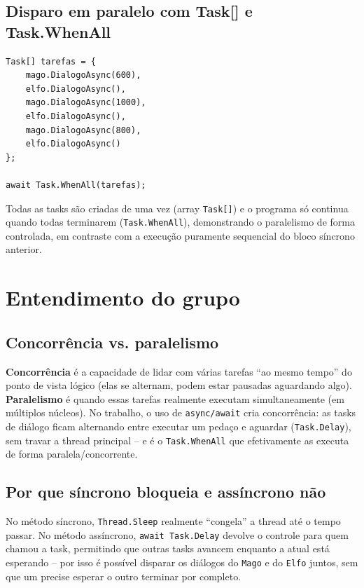 \documentclass[12pt,a4paper]{article}
\begin{document}
\subsection{Disparo em paralelo com Task[] e Task.WhenAll}

\begin{lstlisting}
Task[] tarefas = {
    mago.DialogoAsync(600),
    elfo.DialogoAsync(),
    mago.DialogoAsync(1000),
    elfo.DialogoAsync(),
    mago.DialogoAsync(800),
    elfo.DialogoAsync()
};

await Task.WhenAll(tarefas);
\end{lstlisting}

Todas as tasks são criadas de uma vez (array \texttt{Task[]}) e o programa só
continua quando todas terminarem (\texttt{Task.WhenAll}), demonstrando o paralelismo
de forma controlada, em contraste com a execução puramente sequencial do bloco
síncrono anterior.

\section{Entendimento do grupo}

\subsection{Concorrência vs. paralelismo}

\textbf{Concorrência} é a capacidade de lidar com várias tarefas ``ao mesmo tempo''
do ponto de vista lógico (elas se alternam, podem estar pausadas aguardando
algo). \textbf{Paralelismo} é quando essas tarefas realmente executam
simultaneamente (em múltiplos núcleos). No trabalho, o uso de \texttt{async/await}
cria concorrência: as tasks de diálogo ficam alternando entre executar um
pedaço e aguardar (\texttt{Task.Delay}), sem travar a thread principal -- e é o
\texttt{Task.WhenAll} que efetivamente as executa de forma paralela/concorrente.

\subsection{Por que síncrono bloqueia e assíncrono não}

No método síncrono, \texttt{Thread.Sleep} realmente ``congela'' a thread até o
tempo passar. No método assíncrono, \texttt{await Task.Delay} devolve o controle
para quem chamou a task, permitindo que outras tasks avancem enquanto a atual
está esperando -- por isso é possível disparar os diálogos do \texttt{Mago} e do
\texttt{Elfo} juntos, sem que um precise esperar o outro terminar por completo.
\end{document}
